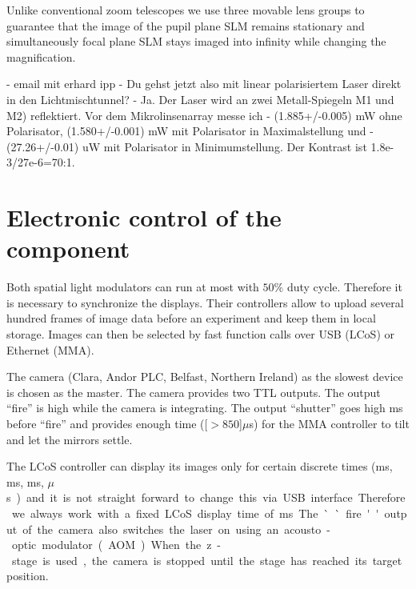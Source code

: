 Unlike conventional zoom telescopes we use three movable lens groups
to guarantee that the image of the pupil plane SLM remains stationary
and simultaneously focal plane SLM stays imaged into infinity while
changing the magnification.

 - email mit erhard ipp
  - Du gehst jetzt also mit linear polarisiertem Laser direkt in den Lichtmischtunnel?
  - Ja. Der Laser wird an zwei Metall-Spiegeln M1 und M2)
     reflektiert. Vor dem Mikrolinsenarray messe ich
   - (1.885+/-0.005) mW ohne Polarisator, (1.580+/-0.001) mW mit
     Polarisator in Maximalstellung und
   - (27.26+/-0.01) uW mit Polarisator in Minimumstellung.  Der
     Kontrast ist 1.8e-3/27e-6=70:1.


\section{Electronic control of the component}

Both spatial light modulators can run at most with $50\%$ duty
cycle. Therefore it is necessary to synchronize the displays. Their
controllers allow to upload several hundred frames of image data
before an experiment and keep them in local storage. Images can then
be selected by fast function calls over USB (LCoS) or Ethernet (MMA).

The camera (Clara, Andor PLC, Belfast, Northern Ireland) as the
slowest device is chosen as the master. The camera provides two TTL
outputs. The output ``fire'' is high while the camera is
integrating. The output ``shutter'' goes high \unit[1]{ms} before
``fire'' and provides enough time (\unit[$>850$]{$\mu$s}) for the MMA
controller to tilt and let the mirrors settle.

The LCoS controller can display its images only for certain discrete
times (\unit[20]{ms}, \unit[10]{ms}, \unit[5]{ms}, \unit[200]{$\mu$s})
and it is not straight forward to change this via USB
interface. Therefore we always work with a fixed LCoS display time of
\unit[20]{ms}. The ``fire'' output of the camera also switches the
laser on using an acousto-optic modulator (AOM).

When the z-stage is used, the camera is stopped until the stage has
reached its target position.







